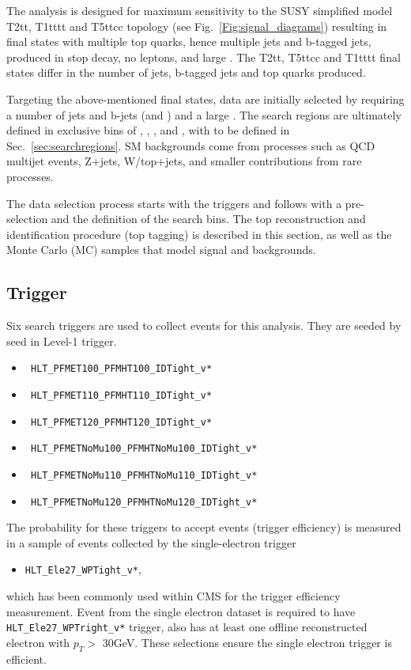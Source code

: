 The analysis is designed for maximum sensitivity to the SUSY simplified model
T2tt, T1tttt and T5ttcc topology (see Fig.~\ref{Fig:signal_diagrams}) resulting in 
final states with multiple top quarks, hence multiple jets and b-tagged jets, produced in stop decay, no leptons, 
and large \MET.
The T2tt, T5ttcc and T1tttt final states differ in the number of jets, b-tagged jets and top quarks produced. 

Targeting the above-mentioned final states, data are initially selected 
by requiring a number of jets and b-jets (\njets and \nbjets) and a large \MET. 
The search regions are ultimately defined in exclusive bins of 
\ntops, \nbjets, \HT, \MET and \MTTwo, with \MTTwo to be defined in 
Sec.~\ref{sec:searchregions}. SM backgrounds come from processes such as QCD
multijet events, Z+jets, W/top+jets, and smaller contributions from rare
processes.

The data selection process starts with the triggers and follows with a 
pre-selection and the definition of the search bins. The top reconstruction
and identification procedure (top tagging) is described in this section, 
as well as the Monte Carlo (MC) samples that model signal and backgrounds.

\subsection{Trigger}
\label{sec:trig}
Six search triggers are used to collect events for this analysis. They are
seeded by \MET seed in Level-1 trigger. 
\begin{itemize}
\item \texttt{ HLT\_PFMET100\_PFMHT100\_IDTight\_v*}
\item \texttt{ HLT\_PFMET110\_PFMHT110\_IDTight\_v*}
\item \texttt{ HLT\_PFMET120\_PFMHT120\_IDTight\_v*}
\item \texttt{ HLT\_PFMETNoMu100\_PFMHTNoMu100\_IDTight\_v*} 
\item \texttt{ HLT\_PFMETNoMu110\_PFMHTNoMu110\_IDTight\_v* }
\item \texttt{ HLT\_PFMETNoMu120\_PFMHTNoMu120\_IDTight\_v*}
\end{itemize}

The probability for these triggers to accept events (trigger efficiency) is
measured in a sample of events collected by the single-electron trigger
\begin{itemize}
  \item \texttt{HLT\_Ele27\_WPTight\_v*},
\end{itemize}
which has been commonly used within CMS for the \MET trigger efficiency measurement. 
Event from the single electron dataset is required to have
\texttt{HLT\_Ele27\_WPTright\_v*} trigger, also has at least one offline
reconstructed electron with $p_{T}>$ 30GeV. These selections ensure the single
electron trigger is efficient. 


